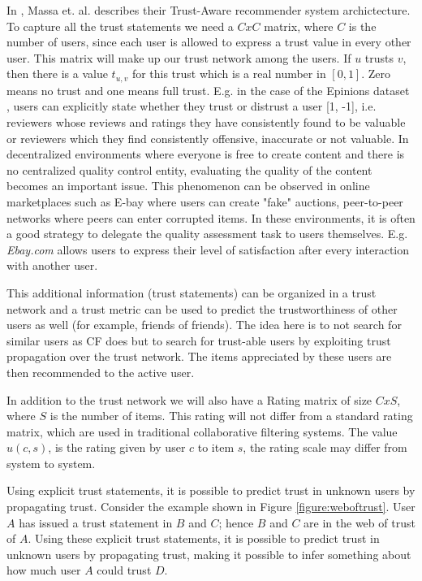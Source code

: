 In \cite{Massa2004}, Massa et. al. describes their Trust-Aware recommender system archictecture.
To capture all the trust statements we need a $CxC$ matrix, where $C$ is the number of users, since each user is allowed to express a trust value in every other user. This matrix will make up our trust network among the users. If $u$
trusts $v$, then there is a value $t_{u,v}$ for this trust which is a real
number in $[0,1]$. Zero means no trust and one means full trust. E.g. in the case of the Epinions dataset \cite{Epinions}, users can explicitly state whether they trust or distrust a user [1, -1], i.e. reviewers whose reviews and ratings they have consistently found to be valuable or reviewers which they find consistently offensive, inaccurate or not valuable. In decentralized environments where everyone is free to create content and there
is no centralized quality control entity, evaluating the quality of the content becomes an important issue. This phenomenon can be observed in online
marketplaces such as E-bay where users can create "fake" auctions, peer-to-peer networks where peers can enter corrupted items. In these environments, it is often a good strategy to delegate the quality assessment task to users themselves. E.g. \emph{Ebay.com} allows users to express their level of satisfaction after every interaction with another user.

This additional information (trust statements) can be organized in a trust network and a trust metric can be used to predict the
trustworthiness of other users as well (for example, friends of friends). The idea here is to not search for similar users as CF does but to search for
trust-able users by exploiting trust propagation over the trust network. The items appreciated by these users are then recommended to the active user. 


In addition to the trust network we will also have a Rating matrix of size $CxS$, where $S$ is
the number of items. This rating will not differ from a standard rating matrix,
which are used in traditional collaborative filtering systems. The value $u(c,s)$, is the rating given by user $c$ to item $s$, the rating scale may differ from system to system.

Using explicit trust statements, it is possible to predict trust in unknown
users by propagating trust. Consider the example shown in Figure
\ref{figure:weboftrust}. User $A$ has issued a trust statement in $B$ and $C$; hence
$B$ and $C$ are in the web of trust of $A$. Using these explicit trust statements, it
is possible to predict trust in unknown users by propagating trust, making it
possible to infer something about how much user $A$ could trust $D$.


